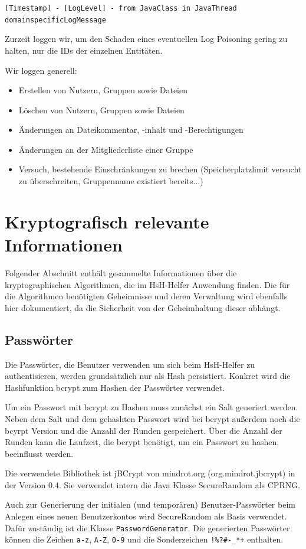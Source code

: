 \documentclass[12pt,DIV14,BCOR10mm,a4paper,parskip=half-,headsepline,headinclude,english,ngerman,bibliography=totocnumbered]{scrreprt}
\begin{document}
\texttt{[Timestamp] - [LogLevel] - from JavaClass in JavaThread\\
domainspecificLogMessage}

Zurzeit loggen wir, um den Schaden eines eventuellen Log Poisoning gering zu halten, nur die IDs der einzelnen Entitäten.

Wir loggen generell:
\begin{itemize}
	\item Erstellen von Nutzern, Gruppen sowie Dateien
	\item Löschen von Nutzern, Gruppen sowie Dateien
	\item Änderungen an Dateikommentar, -inhalt und -Berechtigungen
	\item Änderungen an der Mitgliederliste einer Gruppe
	\item Versuch, bestehende Einschränkungen zu brechen (Speicherplatzlimit versucht zu überschreiten, Gruppenname existiert bereits...)
\end{itemize}

\chapter{Kryptografisch relevante Informationen}
Folgender Abschnitt enthält gesammelte Informationen über die kryptographischen Algorithmen, die im HsH-Helfer Anwendung finden. Die für die Algorithmen benötigten Geheimnisse und deren Verwaltung wird ebenfalls hier dokumentiert, da die Sicherheit von der Geheimhaltung dieser abhängt.

\section{Passwörter}
Die Passwörter, die Benutzer verwenden um sich beim HsH-Helfer zu authentisieren, werden grundsätzlich nur als Hash persistiert. Konkret wird die Hashfunktion bcrypt zum Hashen der Passwörter verwendet.

Um ein Passwort mit bcrypt zu Hashen muss zunächst ein Salt generiert werden. Neben dem Salt und dem gehashten Passwort wird bei bcrypt außerdem noch die bcyrpt Version und die Anzahl der Runden gespeichert. Über die Anzahl der Runden kann die Laufzeit, die bcrypt benötigt, um ein Passwort zu hashen, beeinflusst werden.

Die verwendete Bibliothek ist jBCrypt von mindrot.org (org.mindrot.jbcrypt) in der Version 0.4. Sie verwendet intern die Java Klasse SecureRandom als CPRNG.

Auch zur Generierung der initialen (und temporären) Benutzer-Passwörter beim Anlegen eines neuen Benutzerkontos wird SecureRandom als Basis verwendet. Dafür zuständig ist die Klasse \texttt{PasswordGenerator}. Die generierten Passwörter können die Zeichen \texttt{a-z}, \texttt{A-Z}, \texttt{0-9} und die Sonderzeichen \texttt{!\%?\#-\_*+} enthalten.
\end{document}
